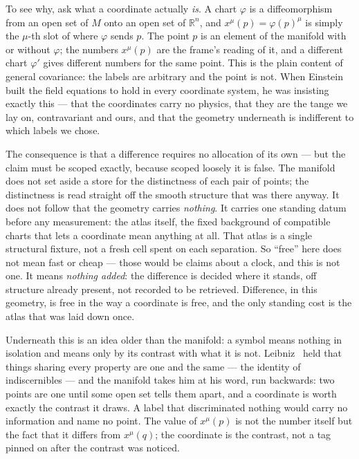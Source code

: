 To see why, ask what a coordinate actually \emph{is}. A chart $\varphi$ is a diffeomorphism from an open set of $M$ onto an
open set of $\mathbb{R}^n$, and $x^\mu(p) = \varphi(p)^\mu$ is simply the $\mu$-th slot of where $\varphi$ sends $p$. The
point $p$ is an element of the manifold with or without $\varphi$; the numbers $x^\mu(p)$ are the frame's reading of it, and
a different chart $\varphi'$ gives different numbers for the same point. This is the plain content of general covariance: the
labels are arbitrary and the point is not. When Einstein~\cite{einstein1916} built the field equations to hold in every
coordinate system, he was insisting exactly this --- that the coordinates carry no physics, that they are the tange we lay
on, contravariant and ours, and that the geometry underneath is indifferent to which labels we chose.

The consequence is that a difference requires no allocation of its own --- but the claim must be scoped exactly, because
scoped loosely it is false. The manifold does not set aside a store for the distinctness of each pair of points; the
distinctness is read straight off the smooth structure that was there anyway. It does not follow that the geometry carries
\emph{nothing}. It carries one standing datum before any measurement: the atlas itself, the fixed background of compatible
charts that lets a coordinate mean anything at all. That atlas is a single structural fixture, not a fresh cell spent on each
separation. So ``free'' here does not mean fast or cheap --- those would be claims about a clock, and this is not one. It
means \emph{nothing added}: the difference is decided where it stands, off structure already present, not recorded to be
retrieved. Difference, in this geometry, is free in the way a coordinate is free, and the only standing cost is the atlas
that was laid down once.

Underneath this is an idea older than the manifold: a symbol means nothing in isolation and means only by its contrast with
what it is not. Leibniz~\cite{leibniz1686} held that things sharing every property are one and the same --- the identity of
indiscernibles --- and the manifold takes him at his word, run backwards: two points are one until some open set tells them
apart, and a coordinate is worth exactly the contrast it draws. A label that discriminated nothing would carry no
information and name no point. The value of $x^\mu(p)$ is not the number itself but the fact that it differs from
$x^\mu(q)$; the coordinate is the contrast, not a tag pinned on after the contrast was noticed.

